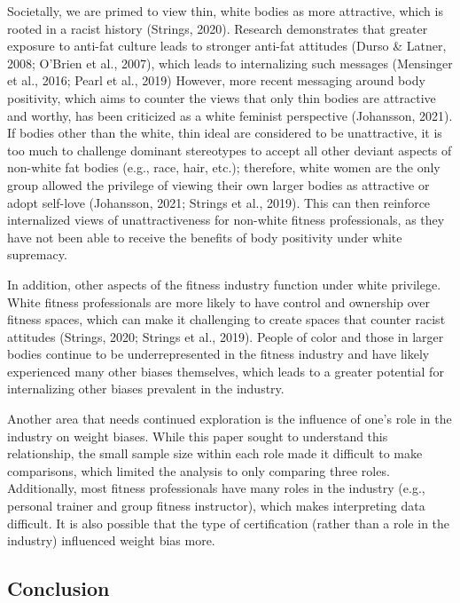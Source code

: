 \documentclass[
  jou,
  longtable,
  nolmodern,
  notxfonts,
  notimes,
  colorlinks=true,linkcolor=blue,citecolor=blue,urlcolor=blue]{apa7}
\begin{document}
Societally, we are primed to view thin, white bodies as more attractive,
which is rooted in a racist history (Strings, 2020). Research
demonstrates that greater exposure to anti-fat culture leads to stronger
anti-fat attitudes (Durso \& Latner, 2008; O'Brien et al., 2007), which
leads to internalizing such messages (Mensinger et al., 2016; Pearl et
al., 2019) However, more recent messaging around body positivity, which
aims to counter the views that only thin bodies are attractive and
worthy, has been criticized as a white feminist perspective (Johansson,
2021). If bodies other than the white, thin ideal are considered to be
unattractive, it is too much to challenge dominant stereotypes to accept
all other deviant aspects of non-white fat bodies (e.g., race, hair,
etc.); therefore, white women are the only group allowed the privilege
of viewing their own larger bodies as attractive or adopt self-love
(Johansson, 2021; Strings et al., 2019). This can then reinforce
internalized views of unattractiveness for non-white fitness
professionals, as they have not been able to receive the benefits of
body positivity under white supremacy.

In addition, other aspects of the fitness industry function under white
privilege. White fitness professionals are more likely to have control
and ownership over fitness spaces, which can make it challenging to
create spaces that counter racist attitudes (Strings, 2020; Strings et
al., 2019). People of color and those in larger bodies continue to be
underrepresented in the fitness industry and have likely experienced
many other biases themselves, which leads to a greater potential for
internalizing other biases prevalent in the industry.

Another area that needs continued exploration is the influence of one's
role in the industry on weight biases. While this paper sought to
understand this relationship, the small sample size within each role
made it difficult to make comparisons, which limited the analysis to
only comparing three roles. Additionally, most fitness professionals
have many roles in the industry (e.g., personal trainer and group
fitness instructor), which makes interpreting data difficult. It is also
possible that the type of certification (rather than a role in the
industry) influenced weight bias more.

\subsection{Conclusion}\label{conclusion}
\end{document}
